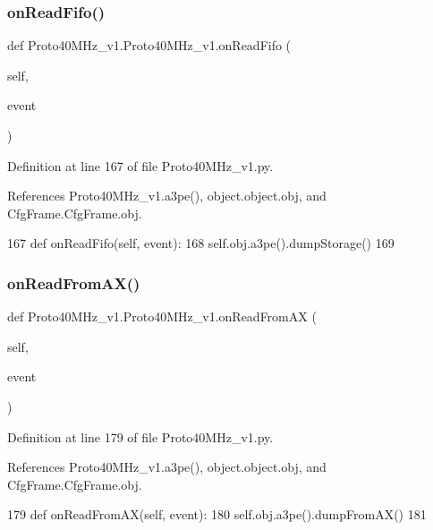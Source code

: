 \subsubsection{\texorpdfstring{on\+Read\+Fifo()}{onReadFifo()}}
{\footnotesize\ttfamily def Proto40\+M\+Hz\+\_\+v1.\+Proto40\+M\+Hz\+\_\+v1.\+on\+Read\+Fifo (\begin{DoxyParamCaption}\item[{}]{self,  }\item[{}]{event }\end{DoxyParamCaption})}



Definition at line 167 of file Proto40\+M\+Hz\+\_\+v1.\+py.



References Proto40\+M\+Hz\+\_\+v1.\+a3pe(), object.\+object.\+obj, and Cfg\+Frame.\+Cfg\+Frame.\+obj.


\begin{DoxyCode}
167     \textcolor{keyword}{def }onReadFifo(self, event):
168         self.obj.a3pe().dumpStorage()
169 
\end{DoxyCode}
\mbox{\label{classProto40MHz__v1_1_1Proto40MHz__v1_a7c2739aa6bc9aa2b84e5dd61a75f1a8a}} 
\subsubsection{\texorpdfstring{on\+Read\+From\+A\+X()}{onReadFromAX()}}
{\footnotesize\ttfamily def Proto40\+M\+Hz\+\_\+v1.\+Proto40\+M\+Hz\+\_\+v1.\+on\+Read\+From\+AX (\begin{DoxyParamCaption}\item[{}]{self,  }\item[{}]{event }\end{DoxyParamCaption})}



Definition at line 179 of file Proto40\+M\+Hz\+\_\+v1.\+py.



References Proto40\+M\+Hz\+\_\+v1.\+a3pe(), object.\+object.\+obj, and Cfg\+Frame.\+Cfg\+Frame.\+obj.


\begin{DoxyCode}
179     \textcolor{keyword}{def }onReadFromAX(self, event):
180         self.obj.a3pe().dumpFromAX()
181 
\end{DoxyCode}
\mbox{\label{classProto40MHz__v1_1_1Proto40MHz__v1_a26f7a8b8616e631dd9f193a683dce4fe}} 
